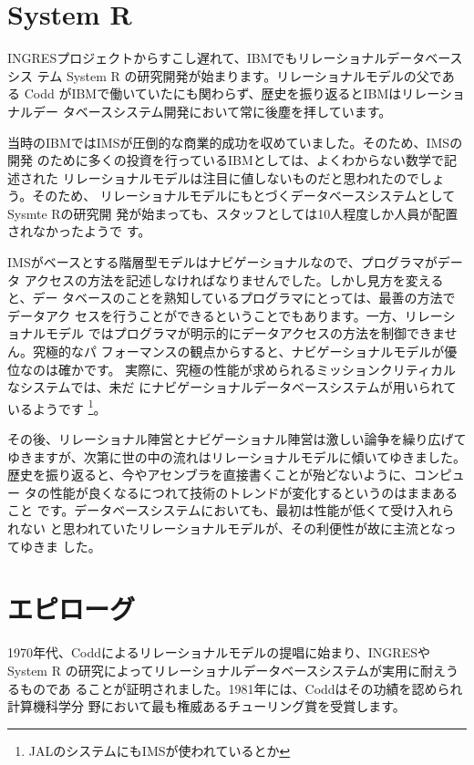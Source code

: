 \section{System R}


INGRESプロジェクトからすこし遅れて、IBMでもリレーショナルデータベースシス
テム System R の研究開発が始まります。リレーショナルモデルの父である
Codd がIBMで働いていたにも関わらず、歴史を振り返るとIBMはリレーショナルデー
タベースシステム開発において常に後塵を拝しています。


当時のIBMではIMSが圧倒的な商業的成功を収めていました。そのため、IMSの開発
のために多くの投資を行っているIBMとしては、よくわからない数学で記述された
リレーショナルモデルは注目に値しないものだと思われたのでしょう。そのため、
リレーショナルモデルにもとづくデータベースシステムとしてSysmte Rの研究開
発が始まっても、スタッフとしては10人程度しか人員が配置されなかったようで
す。


IMSがベースとする階層型モデルはナビゲーショナルなので、プログラマがデータ
アクセスの方法を記述しなければなりませんでした。しかし見方を変えると、デー
タベースのことを熟知しているプログラマにとっては、最善の方法でデータアク
セスを行うことができるということでもあります。一方、リレーショナルモデル
ではプログラマが明示的にデータアクセスの方法を制御できません。究極的なパ
フォーマンスの観点からすると、ナビゲーショナルモデルが優位なのは確かです。
実際に、究極の性能が求められるミッションクリティカルなシステムでは、未だ
にナビゲーショナルデータベースシステムが用いられているようです
\footnote{JALのシステムにもIMSが使われているとか}。


その後、リレーショナル陣営とナビゲーショナル陣営は激しい論争を繰り広げて
ゆきますが、次第に世の中の流れはリレーショナルモデルに傾いてゆきました。
歴史を振り返ると、今やアセンブラを直接書くことが殆どないように、コンピュー
タの性能が良くなるにつれて技術のトレンドが変化するというのはままあること
です。データベースシステムにおいても、最初は性能が低くて受け入れられない
と思われていたリレーショナルモデルが、その利便性が故に主流となってゆきま
した。


\section{エピローグ}


1970年代、Coddによるリレーショナルモデルの提唱に始まり、INGRESやSystem R
の研究によってリレーショナルデータベースシステムが実用に耐えうるものであ
ることが証明されました。1981年には、Coddはその功績を認められ計算機科学分
野において最も権威あるチューリング賞を受賞します。


